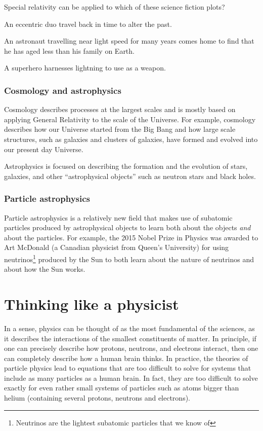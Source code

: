 \begin{checkpoint}
\begin{MCquestion}{Special relativity can be applied to which of these science fiction plots?}
\item An eccentric duo travel back in time to alter the past. 
\item An astronaut travelling near light speed for many years comes home to find that he has aged less than his family on Earth. \correct
\item A superhero harnesses lightning to use as a weapon.
\end{MCquestion}
\end{checkpoint}

\subsubsection{Cosmology and astrophysics} 
Cosmology describes processes at the largest scales and is mostly based on applying General Relativity to the scale of the Universe. For example, cosmology describes how our Universe started from the Big Bang and how large scale structures, such as galaxies and clusters of galaxies, have formed and evolved into our present day Universe. 


Astrophysics is focused on describing the formation and the evolution of stars, galaxies, and other ``astrophysical objects'' such as neutron stars and black holes. 

\subsubsection{Particle astrophysics}
Particle astrophysics is a relatively new field that makes use of subatomic particles produced by astrophysical objects to learn both about the objects \textit{and} about the particles. For example, the 2015 Nobel Prize in Physics was awarded to Art McDonald (a Canadian physicist from Queen's University) for using neutrinos\footnote{Neutrinos are the lightest subatomic particles that we know of} produced by the Sun to both learn about the nature of neutrinos and about how the Sun works. 

\section{Thinking like a physicist}
In a sense, physics can be thought of as the most fundamental of the sciences, as it describes the interactions of the smallest constituents of matter. In principle, if one can precisely describe how protons, neutrons, and electrons interact, then one can completely describe how a human brain thinks. In practice, the theories of particle physics lead to equations that are too difficult to solve for systems that include as many particles as a human brain. In fact, they are too difficult to solve exactly for even rather small systems of particles such as atoms bigger than helium (containing several protons, neutrons and electrons). 

